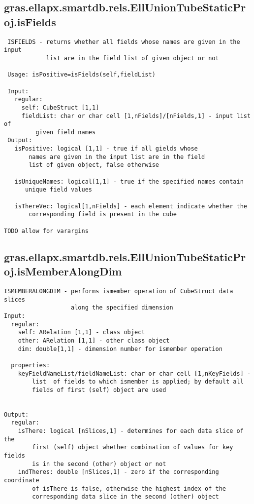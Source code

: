 \subsection{\texorpdfstring{gras.ellapx.smartdb.rels.EllUnionTubeStaticProj.isFields}{isFields}}\label{method:gras.ellapx.smartdb.rels.EllUnionTubeStaticProj.isFields}
\begin{verbatim}
 ISFIELDS - returns whether all fields whose names are given in the input
            list are in the field list of given object or not

 Usage: isPositive=isFields(self,fieldList)

 Input:
   regular:
     self: CubeStruct [1,1]
     fieldList: char or char cell [1,nFields]/[nFields,1] - input list of
         given field names
 Output:
   isPositive: logical [1,1] - true if all gields whose
       names are given in the input list are in the field
       list of given object, false otherwise

   isUniqueNames: logical[1,1] - true if the specified names contain
      unique field values

   isThereVec: logical[1,nFields] - each element indicate whether the
       corresponding field is present in the cube

TODO allow for varargins
\end{verbatim}
\subsection{\texorpdfstring{gras.ellapx.smartdb.rels.EllUnionTubeStaticProj.isMemberAlongDim}{isMemberAlongDim}}\label{method:gras.ellapx.smartdb.rels.EllUnionTubeStaticProj.isMemberAlongDim}
\begin{verbatim}
ISMEMBERALONGDIM - performs ismember operation of CubeStruct data slices
                   along the specified dimension
Input:
  regular:
    self: ARelation [1,1] - class object
    other: ARelation [1,1] - other class object
    dim: double[1,1] - dimension number for ismember operation

  properties:
    keyFieldNameList/fieldNameList: char or char cell [1,nKeyFields] -
        list  of fields to which ismember is applied; by default all
        fields of first (self) object are used


Output:
  regular:
    isThere: logical [nSlices,1] - determines for each data slice of the
        first (self) object whether combination of values for key fields
        is in the second (other) object or not
    indTheres: double [nSlices,1] - zero if the corresponding coordinate
        of isThere is false, otherwise the highest index of the
        corresponding data slice in the second (other) object
\end{verbatim}
